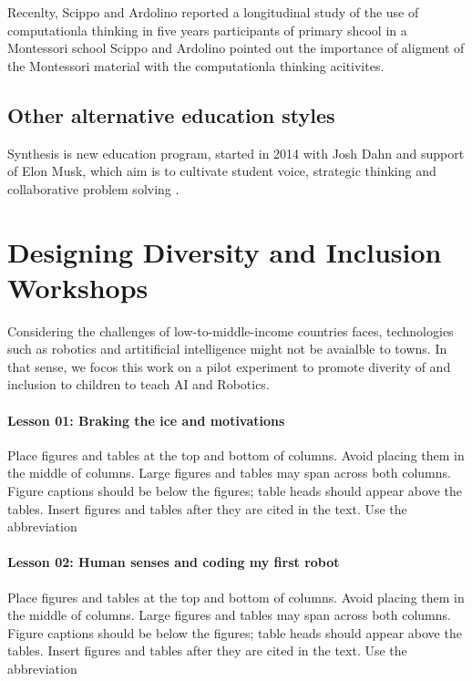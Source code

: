 \documentclass[conference]{IEEEtran}
\begin{document}
Recenlty, Scippo and Ardolino reported a longitudinal study of the use of computationla thinking in five years participants of primary shcool in a Montessori school \cite{ScippoArdolino2021}
Scippo and Ardolino pointed out the importance of aligment of the Montessori material with the computationla thinking acitivites. 

\subsection{Other alternative education styles}
Synthesis is new education program, started in 2014 with Josh Dahn and support of Elon Musk, which aim is to cultivate student voice, strategic thinking and collaborative problem solving \cite{synthesis2022}.

\section{Designing Diversity and Inclusion  Workshops}
Considering the challenges of low-to-middle-income countries faces, technologies such as robotics and artitificial intelligence might not be avaialble to towns. 
In that sense, we focos this work on a pilot experiment to promote diverity of and inclusion to children to teach AI and Robotics. 

\paragraph{Lesson 01: Braking the ice and motivations} 
Place figures and tables at the top and bottom of columns. Avoid placing them in the middle of columns. 
Large figures and tables may span across both columns. Figure captions should be below the figures; table heads should appear above the tables. 
Insert figures and tables after they are cited in the text. Use the abbreviation 

\paragraph{Lesson 02: Human senses and coding my first robot} 
Place figures and tables at the top and bottom of columns. Avoid placing them in the middle of columns. 
Large figures and tables may span across both columns. Figure captions should be below the figures; table heads should appear above the tables. 
Insert figures and tables after they are cited in the text. Use the abbreviation 
\end{document}
